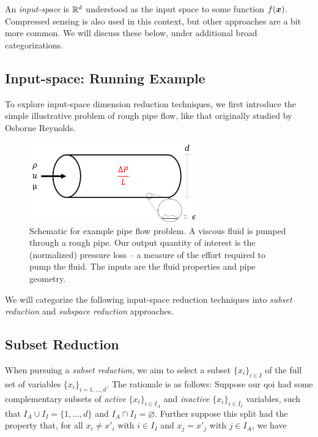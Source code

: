 \documentclass{article}
\begin{document}
\bigskip\noindent An \emph{input-space} is $\mathbb{R}^{d}$ understood as the input space
to some function $f(\boldsymbol{x})$. Compressed sensing is also used in this
context,\cite{tang2014subsampled} but other approaches are a bit more common. We
will discuss these below, under additional broad categorizations.

\subsection{Input-space: Running Example}
To explore input-space dimension reduction techniques, we first introduce the
simple illustrative problem of rough pipe flow, like that originally studied by
Osborne Reynolds.\cite{reynolds1883}

\begin{figure}[!ht]
  \centering
  \includegraphics[width=0.65\textwidth]{../../images/pipe_diagram}
  \caption{Schematic for example pipe flow problem. A viscous fluid is pumped
    through a rough pipe. Our output quantity of interest is the (normalized)
    pressure loss -- a measure of the effort required to pump the fluid. The
    inputs are the fluid properties and pipe geometry.}
  \label{fig:pipe_diagram}
\end{figure}

We will categorize the following input-space reduction techniques into
\emph{subset reduction} and \emph{subspace reduction} approaches.

\subsection{Subset Reduction}
When pursuing a \emph{subset reduction}, we aim to select a subset
$\{x_i\}_{i\in I}$ of the full set of variables $\{x_i\}_{i=1,\dots,d}$. The
rationale is as follows: Suppose our qoi had some complementary subsets of
\emph{active} $\{x_i\}_{i\in I_A}$ and \emph{inactive} $\{x_i\}_{i\in I_I}$
variables, such that $I_A\cup I_I = \{1,\dots,d\}$ and $I_A\cap
I_I=\varnothing$. Further suppose this split had the property that, for all
$x_i\neq x'_i$ with $i\in I_I$ and $x_j=x'_j$ with $j\in I_A$, we have
\end{document}

